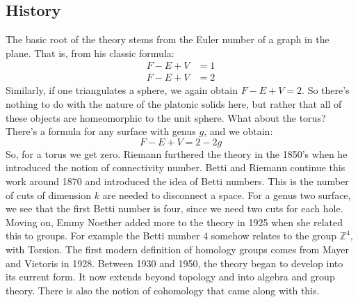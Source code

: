     \subsection{History}
        The basic root of the theory stems from the
        Euler number of a graph in the plane. That is,
        from his classic formula:
        \begin{align}
            F-E+V&=1
            \tag{Planar Graphs}\\
            F-E+V&=2
            \tag{Platonic Solids}
        \end{align}
        Similarly, if one triangulates a sphere, we again
        obtain $F-E+V=2$. So there's nothing to do with the
        nature of the platonic solids here, but rather that
        all of these objects are homeomorphic to the
        unit sphere. What about the torus? There's a formula
        for any surface with genus $g$, and we obtain:
        \begin{equation}
            F-E+V=2-2g
        \end{equation}
        So, for a torus we get zero. Riemann furthered the
        theory in the 1850's when he introduced the notion of
        connectivity number. Betti and Riemann continue this
        work around 1870 and introduced the idea of Betti
        numbers. This is the number of cuts of dimension $k$
        are needed to disconnect a space. For a genus
        two surface, we see that the first Betti number is
        four, since we need two cuts for each hole. Moving on,
        Emmy Noether added more to the theory in 1925
        when she related this to groups. For example the
        Betti number 4 somehow relates to the group
        $\mathbb{Z}^{4}$, with Torsion. The first modern
        definition of homology groups comes from Mayer and
        Vietoris in 1928. Between 1930 and 1950, the theory
        began to develop into its current form. It now extends
        beyond topology and into algebra and group theory.
        There is also the notion of cohomology that came along
        with this.
